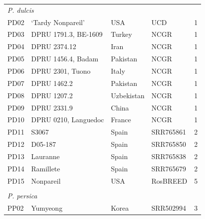 \documentclass[12pt]{article}
\begin{document}
\begin{center}
\begin{longtable}{lllll}
                 \multicolumn{5}{l}{\emph{P. dulcis}}  \\
                 PD02 &‘Tardy Nonpareil’ &USA &UCD &1\\
                 PD03 &DPRU 1791.3, BE-1609 &Turkey &NCGR &1\\
                 PD04 &DPRU 2374.12 &Iran &NCGR &1\\
                 PD05 &DPRU 1456.4, Badam &Pakistan &NCGR &1\\
                 PD06 &DPRU 2301, Tuono &Italy &NCGR &1\\
                 PD07 &DPRU 1462.2 &Pakistan &NCGR &1\\
                 PD08 &DPRU 1207.2 &Uzbekistan &NCGR &1\\
                 PD09 &DPRU 2331.9 &China &NCGR &1\\
                 PD10 &DPRU 0210, Languedoc &France &NCGR &1\\ %
                 PD11 &S3067 &Spain &SRR765861 &2\\
                 PD12 &D05-187 &Spain &SRR765850 &2\\
                 PD13 &Lauranne &Spain &SRR765838 &2\\
                 PD14 &Ramillete &Spain &SRR765679 &2\\
                 PD15 &Nonpareil & USA&RosBREED &5\\
                 \\
                 \multicolumn{5}{l}{\emph{P. persica}}  \\ %
                 PP02 &Yumyeong &Korea &SRR502994 &3\\

\end{longtable}
\end{center}
\end{document}
